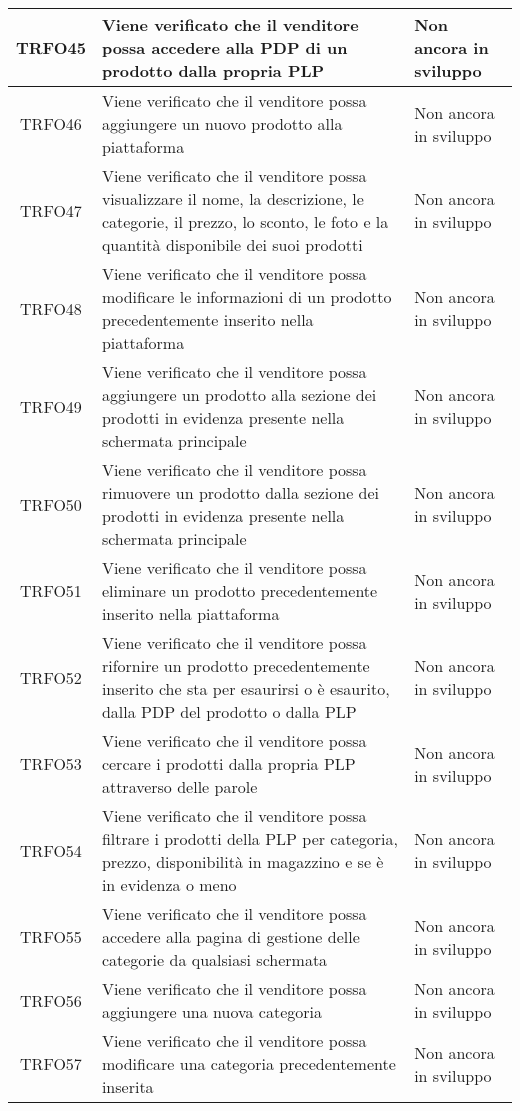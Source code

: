 \begin{longtable}{|c| C{10cm} |C{3cm}|}
	TRFO45 & Viene verificato che il venditore possa accedere alla PDP di un prodotto dalla propria PLP & Non ancora in sviluppo\\ \hline
    	TRFO46 & Viene verificato che il venditore possa aggiungere un nuovo prodotto alla piattaforma & Non ancora in sviluppo\\ \hline
    	TRFO47 & Viene verificato che il venditore possa visualizzare il nome, la descrizione, le categorie, il prezzo, lo sconto, le foto e la quantità disponibile dei suoi prodotti & Non ancora in sviluppo\\ \hline
    	TRFO48 & Viene verificato che il venditore possa modificare le informazioni di un prodotto precedentemente inserito nella piattaforma & Non ancora in sviluppo\\ \hline
    	TRFO49 & Viene verificato che il venditore possa aggiungere un prodotto alla sezione dei prodotti in evidenza presente nella schermata principale & Non ancora in sviluppo\\ \hline
    	TRFO50 & Viene verificato che il venditore possa rimuovere un prodotto dalla sezione dei prodotti in evidenza  presente nella schermata principale & Non ancora in sviluppo\\ \hline
    	TRFO51 & Viene verificato che il venditore possa eliminare un prodotto precedentemente inserito nella piattaforma & Non ancora in sviluppo\\ \hline
    	TRFO52 & Viene verificato che il venditore possa rifornire un prodotto precedentemente inserito che sta per esaurirsi o è esaurito, dalla PDP del prodotto o dalla PLP & Non ancora in sviluppo\\ \hline
   	TRFO53 & Viene verificato che il venditore possa cercare i prodotti dalla propria PLP attraverso delle parole & Non ancora in sviluppo\\ \hline
    	TRFO54 & Viene verificato che il venditore possa filtrare i prodotti della PLP per categoria, prezzo, disponibilità in magazzino e se è in evidenza o meno & Non ancora in sviluppo\\ \hline
	TRFO55 & Viene verificato che il venditore possa accedere alla pagina di gestione delle categorie da qualsiasi schermata & Non ancora in sviluppo\\ \hline
    	TRFO56 & Viene verificato che il venditore possa aggiungere una nuova categoria & Non ancora in sviluppo\\ \hline
    	TRFO57 & Viene verificato che il venditore possa modificare una categoria precedentemente inserita & Non ancora in sviluppo\\ \hline

\end{longtable}
